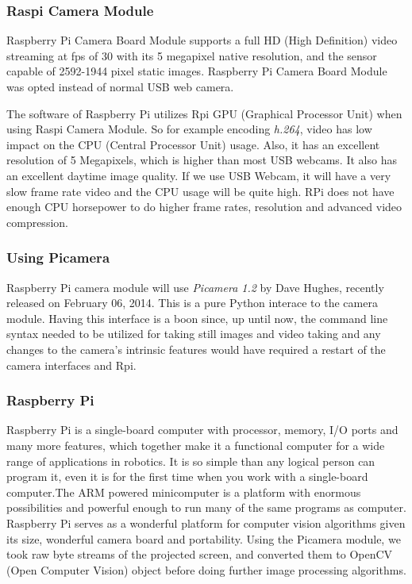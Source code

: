 \documentclass[12pt, a4paper]{article}
\begin{document}
\subsubsection{Raspi Camera Module}
Raspberry Pi Camera Board Module supports a full HD (High Definition) video streaming at fps of 30 with its 5 megapixel native resolution, and the sensor capable of 2592-1944 pixel static images. Raspberry Pi Camera Board Module was opted instead of normal USB web camera. 

The software of Raspberry Pi utilizes Rpi GPU (Graphical Processor Unit) when using Raspi Camera Module. So for example encoding \emph {h.264}, video has low impact on the CPU (Central Processor Unit) usage. Also, it has an excellent resolution of 5 Megapixels, which is higher than most USB webcams. It also has an excellent daytime image quality. If we use USB Webcam, it will have a very slow frame rate video and the CPU usage will be quite high. RPi does not have enough CPU horsepower to do higher frame rates, resolution and advanced video compression. 

\subsubsection{Using Picamera}
Raspberry Pi camera module will use \emph{Picamera 1.2} by Dave Hughes, recently released on February 06, 2014. This is a pure Python interace to the camera module. Having this interface is a boon since, up until now, the command line syntax needed to be utilized for taking still images and video taking and any changes to the camera's intrinsic features would have required a restart of the camera interfaces and Rpi.

\subsubsection{Raspberry Pi}
Raspberry Pi is a single-board computer with processor, memory, I/O ports and many more features, which together make it a functional computer for a wide range of applications in robotics. It is so simple than any logical person can program it, even it is for the first time when you work with a single-board computer.The ARM powered minicomputer is a platform with enormous possibilities and powerful enough to run many of the same programs as computer. Raspberry Pi serves as a wonderful platform for computer vision algorithms given its size, wonderful camera board and portability. Using the Picamera module, we took raw byte streams of the projected screen, and converted them to OpenCV (Open Computer Vision) object before doing further image processing algorithms.
\end{document}
